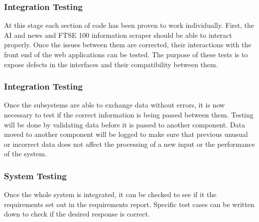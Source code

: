 \documentclass[]{IEEEtran}
\begin{document}
	\subsubsection{Integration Testing}
	At this stage each section of code has been proven to work individually. First, the AI and news and FTSE 100 information scraper should be able to interact properly. Once the issues between them are corrected, their interactions with the front end of the web applications can be tested. The purpose of these tests is to expose defects in the interfaces and their compatibility between them.
	
	\subsubsection{Integration Testing}
	Once the subsystems are able to exchange data without errors, it is now necessary to test if the correct information is being passed between them. Testing will be done by validating data before it is passed to another component. Data moved to another component will be logged to make sure that previous unusual or incorrect data does not affect the processing of a new input or the performance of the system.
	
	\subsubsection{System Testing}
	Once the whole system is integrated, it can be checked to see if it  the requirements set out in the requirements report. Specific test cases can be written down to check if the desired response is correct.
	
\end{document}
